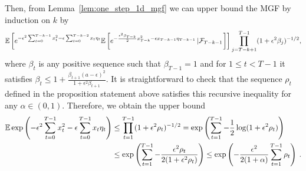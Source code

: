 Then, from Lemma~\ref{lem:one_step_1d_mgf} we can upper bound the MGF by induction on $k$ by
\begin{align*}
\mathbb{E} \left[e^{ - \epsilon^2 \sum_{t = 0}^{T - k - 1} x_t^2 - \epsilon \sum_{t = 0}^{T - k - 2} x_t \eta_t}\mathbb{E}\left[ e^{-\frac{\epsilon^2\beta_{T - k}}{2} x_{T - k}^2 - \epsilon x_{T - k - 1} \eta_{T - k - 1}}\left| \mathcal{F}_{T - k - 1}\right.\right]\right] \prod_{j = T - k + 1}^{T - 1} (1 + \epsilon^2 \beta_j)^{-1/2},
\end{align*}
where $\beta_t$ is any positive sequence such that $\beta_{T - 1} = 1$ and for $1 \leq t < T - 1$ it satisfies $\beta_t \leq 1 + \frac{\beta_{t +1}(a - \epsilon)^2}{1 + \epsilon^2 \beta_{t + 1}}$. It is straightforward to check that the sequence $\rho_t$ defined in the proposition statement above satisfies this
recursive inequality for any $\alpha \in (0,1)$. Therefore, we obtain the upper bound
\begin{align*}
\mathbb{E} \exp\left(- \epsilon^2 \sum_{t = 0}^{T - 1} x_t^2 - \epsilon \sum_{t = 0}^{T - 1} x_t \eta_t\right) &\leq \prod_{t = 1}^{T - 1}(1 + \epsilon^2 \rho_t)^{-1/2} = \exp\left(\sum_{t = 1}^{T - 1}-\frac{1}{2}\log (1 + \epsilon^2 \rho_t)\right) \\
&\leq \exp\left(\sum_{t = 1}^{T - 1}-\frac{\epsilon^2 \rho_t}{2(1 + \epsilon^2 \rho_t)}\right) \leq \exp\left(-\frac{\epsilon^2}{2(1 + \alpha)} \sum_{t = 1}^{T - 1}\rho_t\right) \:.
\end{align*}

